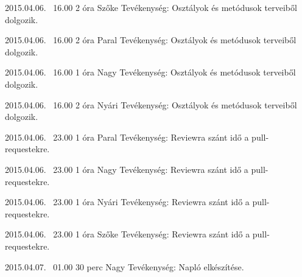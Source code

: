 \begin{naplo}
    \bejegyzes
    {2015.04.06. ~16.00}
    {2 óra}
    {Szőke} 
    { Tevékenység: Osztályok és metódusok terveiből dolgozik.\newline }    

    \bejegyzes
    {2015.04.06. ~16.00}
    {2 óra}
    {Paral} 
    { Tevékenység: Osztályok és metódusok terveiből dolgozik.\newline }    
    
    \bejegyzes
    {2015.04.06. ~16.00}
    {1 óra}
    {Nagy} 
    { Tevékenység: Osztályok és metódusok terveiből dolgozik.\newline }    
    
    \bejegyzes
    {2015.04.06. ~16.00}
    {2 óra}
    {Nyári} 
    { Tevékenység: Osztályok és metódusok terveiből dolgozik.\newline }    
    
    \bejegyzes
    {2015.04.06. ~23.00}
    {1 óra}
    {Paral} 
    {Tevékenység: Reviewra szánt idő a pull-requestekre.\newline } 

    \bejegyzes
    {2015.04.06. ~23.00}
    {1 óra}
    {Nagy} 
    {Tevékenység: Reviewra szánt idő a pull-requestekre.\newline } 

    \bejegyzes
    {2015.04.06. ~23.00}
    {1 óra}
    {Nyári} 
    {Tevékenység: Reviewra szánt idő a pull-requestekre.\newline } 

    \bejegyzes
    {2015.04.06. ~23.00}
    {1 óra}
    {Szőke} 
    {Tevékenység: Reviewra szánt idő a pull-requestekre.\newline } 
    
	\bejegyzes
	{2015.04.07. ~01.00}
	{30 perc}
	{Nagy} 
	{Tevékenység: Napló elkészítése.\newline } 
	
\end{naplo}



